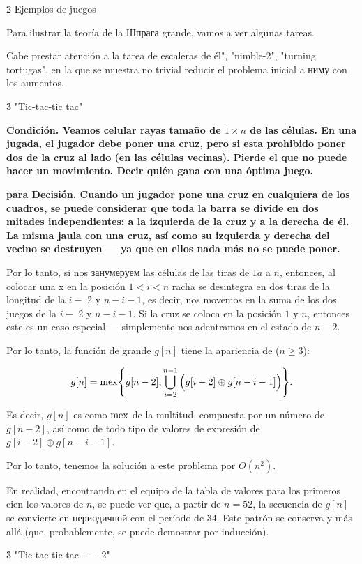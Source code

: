 \h2{ Ejemplos de juegos }

Para ilustrar la teoría de la Шпрага grande, vamos a ver algunas tareas.

Cabe prestar atención a la tarea de escaleras de él", "nimble-2", "turning tortugas", en la que se muestra no trivial reducir el problema inicial a ниму con los aumentos.


\h3{ "Tic-tac-tic tac" }

\bf{Condición}. Veamos celular rayas tamaño de $1 \times n$ de las células. En una jugada, el jugador debe poner una cruz, pero si esta prohibido poner dos de la cruz al lado (en las células vecinas). Pierde el que no puede hacer un movimiento. Decir quién gana con una óptima juego.

\bf{para Decisión}. Cuando un jugador pone una cruz en cualquiera de los cuadros, se puede considerar que toda la barra se divide en dos mitades independientes: a la izquierda de la cruz y a la derecha de él. La misma jaula con una cruz, así como su izquierda y derecha del vecino se destruyen --- ya que en ellos nada más no se puede poner.

Por lo tanto, si nos занумеруем las células de las tiras de $1 a$ a $n$, entonces, al colocar una x en la posición $1 < i < n$ racha se desintegra en dos tiras de la longitud de la $i-$ 2 y $n-i-1$, es decir, nos movemos en la suma de los dos juegos de la $i-$ 2 y $n-i-1$. Si la cruz se coloca en la posición $1$ y $n$, entonces este es un caso especial --- simplemente nos adentramos en el estado de $n-2$.

Por lo tanto, la función de grande $g[n]$ tiene la apariencia de ($n \ge 3$):

$$ g[n] = {\rm mex} \Bigg\{ g[n-2], \bigcup_{i=2}^{n-1} \Big( g[i-2] \oplus g[n-i-1] \Big) \Bigg\}. $$

Es decir, $g[n]$ es como $\rm mex$ de la multitud, compuesta por un número de $g[n-2]$, así como de todo tipo de valores de expresión de $g[i-2] \oplus g[n-i-1]$.

Por lo tanto, tenemos la solución a este problema por $O (n^2)$.

En realidad, encontrando en el equipo de la tabla de valores para los primeros cien los valores de $n$, se puede ver que, a partir de $n=52$, la secuencia de $g[n]$ se convierte en периодичной con el período de $34$. Este patrón se conserva y más allá (que, probablemente, se puede demostrar por inducción).


\h3{ "Tic-tac-tic-tac - - - 2" }

